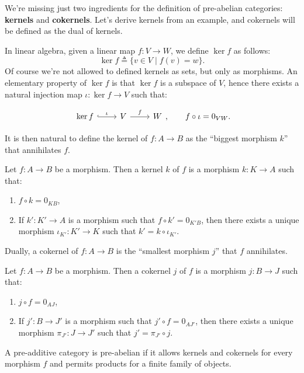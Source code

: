 \documentclass{beamer}
\begin{document}
\begin{frame}
    We're missing just two ingredients for the definition of pre-abelian categories:
    \textbf{kernels} and \textbf{cokernels}. Let's derive kernels from an example,
    and cokernels will be defined as the dual of kernels. \medskip
    
    
    In linear algebra, given a linear map $f : V \to W$, we define $\ker f$ as follows:
    \[
        \ker f \triangleq \{ v \in V \mid f(v) = w \}.
    \]
    Of course we're not allowed to defined kernels as sets, but only as morphisms.
    An elementary property of $\ker f$ is that $\ker f$ is a subspace of $V$, hence
    there exists a natural injection map $\iota : \ker f \to V$ such that:

    \[\begin{tikzcd}[ampersand replacement=\&]
        {\ker f} \& V \& W
        \arrow["\iota", hook, from=1-1, to=1-2]
        \arrow["f", from=1-2, to=1-3]
    \end{tikzcd}, \qquad f \circ \iota = 0_{VW}. \]
\end{frame}

\begin{frame}
    It is then natural to define the kernel of $f : A \to B$ as the ``biggest morphism $k$''
    that annihilates $f$. \medskip

    \begin{definition}
        Let $f : A \to B$ be a morphism. Then a kernel $k$ of $f$ is a morphism
        $k : K \to A$ such that:
        \begin{enumerate}
            \item $f \circ k = 0_{KB}$,
            \item If $k' : K' \to A$ is a morphism such that $f \circ k' = 0_{K'B}$, then
                there exists a unique morphism $\iota_{K'} : K' \to K$ such that
                $k' = k \circ \iota_{K'}$.
        \end{enumerate}
    \end{definition}
\end{frame}

\begin{frame}
    Dually, a cokernel of $f : A \to B$ is the ``smallest morphism $j$'' that
    $f$ annihilates. \medskip

    \begin{definition}
        Let $f : A \to B$ be a morphism. Then a cokernel $j$ of $f$ is a morphism
        $j : B \to J$ such that:
        \begin{enumerate}
            \item $j \circ f = 0_{AJ}$,
            \item If $j' : B \to J'$ is a morphism such that $j' \circ f = 0_{AJ'}$, then
                there exists a unique morphism $\pi_{J'} : J \to J'$ such that
                $j' = \pi_{J'} \circ j$.
        \end{enumerate}
    \end{definition}
\end{frame}

\begin{frame}
    \begin{definition}
        A pre-additive category is pre-abelian if it allows kernels and cokernels for
        every morphism $f$ and permits products for a finite family of objects.
    \end{definition}
\end{frame}
\end{document}
